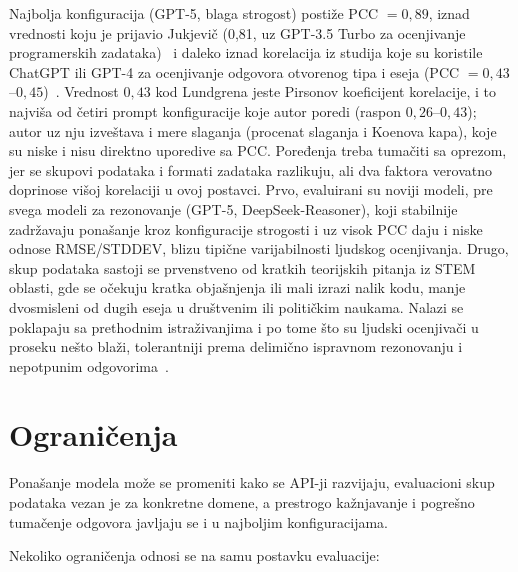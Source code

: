Najbolja konfiguracija (GPT-5, blaga strogost) postiže PCC $= 0{,}89$,
iznad vrednosti koju je prijavio Jukjevič (0{,}81, uz GPT-3.5 Turbo za ocenjivanje programerskih zadataka)~\cite{jukiewicz2024future}
i daleko iznad korelacija iz studija koje su koristile ChatGPT ili GPT-4 za ocenjivanje odgovora otvorenog tipa i eseja
(PCC $= 0{,}43$--$0{,}45$)~\cite{kooli2025transforming,lundgren2024large}.
Vrednost $0{,}43$ kod Lundgrena jeste Pirsonov koeficijent korelacije,
i to najviša od četiri prompt konfiguracije koje autor poredi (raspon $0{,}26$--$0{,}43$);
autor uz nju izveštava i mere slaganja (procenat slaganja i Koenova kapa), koje su niske i nisu direktno uporedive sa PCC.
Poređenja treba tumačiti sa oprezom, jer se skupovi podataka i formati zadataka razlikuju,
ali dva faktora verovatno doprinose višoj korelaciji u ovoj postavci.
Prvo, evaluirani su noviji modeli, pre svega modeli za rezonovanje (GPT-5, DeepSeek-Reasoner),
koji stabilnije zadržavaju ponašanje kroz konfiguracije strogosti i uz visok PCC daju i niske odnose RMSE/STDDEV,
blizu tipične varijabilnosti ljudskog ocenjivanja.
Drugo, skup podataka sastoji se prvenstveno od kratkih teorijskih pitanja iz STEM oblasti,
gde se očekuju kratka objašnjenja ili mali izrazi nalik kodu,
manje dvosmisleni od dugih eseja u društvenim ili političkim naukama.
Nalazi se poklapaju sa prethodnim istraživanjima i po tome što su ljudski ocenjivači u proseku nešto blaži,
tolerantniji prema delimično ispravnom rezonovanju i nepotpunim odgovorima~\cite{jukiewicz2024future}.

\section{Ograničenja}
\label{sec:ogranicenja}

Ponašanje modela može se promeniti kako se API-ji razvijaju, evaluacioni skup podataka vezan je za konkretne domene,
a prestrogo kažnjavanje i pogrešno tumačenje odgovora javljaju se i u najboljim konfiguracijama.

Nekoliko ograničenja odnosi se na samu postavku evaluacije:

